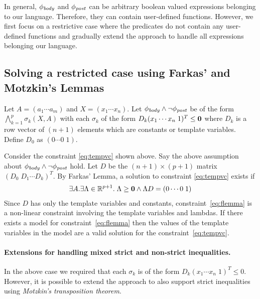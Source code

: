 \documentclass[a4paper,10pt]{article}
\begin{document}
In general, $\mathit{\phi_{body}}$ and $\mathit{\phi_{post}}$ can be arbitrary boolean valued expressions belonging to our language. Therefore, they can contain user-defined functions.
However, we first focus on a restrictive case where the predicates do not contain any user-defined functions and gradually extend the approach to handle all expressions belonging our language.

\subsection{Solving a restricted case using Farkas' and Motzkin's Lemmas}

Let $A = (a_1 \cdots a_m)$ and $X = (x_1 \cdots x_n)$.
Let $\mathit{\phi_{body}} \wedge \neg \mathit{\phi_{post}}$ be of the form 
$\bigwedge \limits_{k=1}^{p} \sigma_k(X,A)$ with each $\sigma_k$ of the form 
$D_k (x_1 \cdots x_n \; 1)^T \le \mathbf{0}$ where $D_k$ is a row vector of $(n+1)$ elements
which are constants or template variables.
Define $D_0$ as $(0 \cdots 0 \; 1)$.

Consider the constraint \ref{eq:tempvc} shown above. Say the above assumption about $\mathit{\phi_{body}} \wedge \neg \mathit{\phi_{post}}$ hold. 
Let $D$ be the $(n+1) \times (p+1)$ matrix $(D_0 \; D_1 \cdots D_k)^T$.
By Farkas' Lemma, a solution to constraint \ref{eq:tempvc} exists if
%
\begin{align}
\exists A. \exists \Lambda \in \mathbb{R}^{p+1}. \; \Lambda \ge \mathbf{0} \wedge \Lambda D =(0 \cdots 0 \; 1) \label{eq:flemma}
\end{align}
%
Since $D$ has only the template variables and constants, constraint~\ref{eq:flemma} is a non-linear constraint involving the template variables and lambdas. If there exists a model for constraint~\ref{eq:flemma} then the values of the template variables in the model are a valid solution for the constraint~\ref{eq:tempvc}.

\paragraph{Extensions for handling mixed strict and non-strict inequalities.}

In the above case we required that each $\sigma_k$ is of the form 
$D_k (x_1 \cdots x_n \; 1)^T \le 0$. However, it is possible to extend the approach to
also support strict inequalities using \emph{Motzkin's transposition theorem}.
\end{document}

